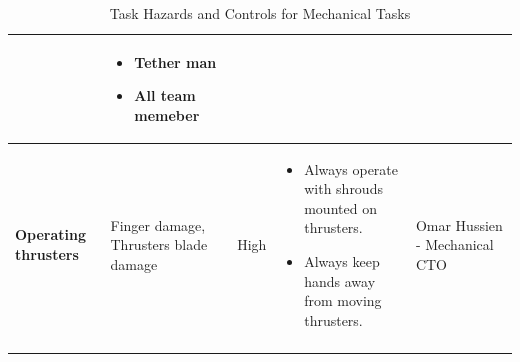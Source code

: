 \documentclass[conference, 12pt]{IEEEtran}
\begin{document}
\begin{longtable}{|>{\raggedright}p{3.5cm}|>{\raggedright}p{3.5cm}|p{1.5cm}|>{\raggedright}p{5cm}|p{3cm}|}
\begin{itemize}[leftmargin=*]
        \end{itemize}
        & {\raggedright
        \vspace{-0.8\baselineskip}\begin{itemize}[leftmargin=*] 
            \item Tether man 
            \item \noindent All team memeber 
        \end{itemize}
        \par} \\
    \hline
    \textbf{Operating thrusters}
        & Finger damage, Thrusters blade damage
        & High
        & \vspace{-0.8\baselineskip}\begin{itemize}[leftmargin=*]
            \item Always operate with shrouds mounted on thrusters.
            \item Always keep hands away from moving thrusters.
        \end{itemize}
        & Omar Hussien - Mechanical CTO \\
    \hline
    \caption{Task Hazards and Controls for Mechanical Tasks}
\end{longtable}

\newpage
\end{document}
